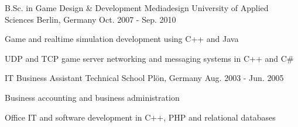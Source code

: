 

\begin{cventries}

  \cventry
    {B.Sc. in Game Design \& Development} %
    {Mediadesign University of Applied Sciences} %
    {Berlin, Germany} %
    {Oct. 2007 - Sep. 2010} %
    {
      \begin{cvitems} %
        \item {Game and realtime simulation development using C++ and Java}
        \item {UDP and TCP game server networking and messaging systems in C++ and C\#}
      \end{cvitems}
    }

  \cventry
    {IT Business Assistant} %
    {Technical School} %
    {Plön, Germany} %
    {Aug. 2003 - Jun. 2005} %
    {
      \begin{cvitems} %
        \item {Business accounting and business administration}
        \item {Office IT and software development in C++, PHP and relational databases}
      \end{cvitems}
    }

\end{cventries}
